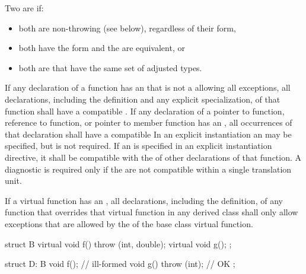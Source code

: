 \pnum
{}%
Two  are
 if:

\begin{itemize}
\item both are non-throwing (see below), regardless of their form,

\item both have the form \tcode{)}
and the  are equivalent, or

\item both are  that have the same
set of adjusted types.
\end{itemize}

\pnum
If any declaration of a function has an
that is not a  allowing all exceptions,
all declarations, including the definition and any explicit specialization,
of that function shall have a compatible
.
If any declaration of a pointer to function, reference to function,
or pointer to member function has an
,
all occurrences of that declaration shall have a compatible
In an explicit instantiation an
may be specified, but is not required.
If an
is specified in an explicit instantiation directive, it shall
be compatible with the  of
other declarations of that function.
A diagnostic is required only if the
 are not compatible
within a single translation unit.

\pnum
{}%
If a virtual function has an
,
all declarations, including the definition, of any function
that overrides that virtual function in any derived class
shall only allow exceptions that are allowed by the
of the base class virtual function.
\enterexample
\begin{codeblock}
struct B {
  virtual void f() throw (int, double);
  virtual void g();
};

struct D: B {
  void f();                     // ill-formed
  void g() throw (int);         // OK
};
\end{codeblock}

